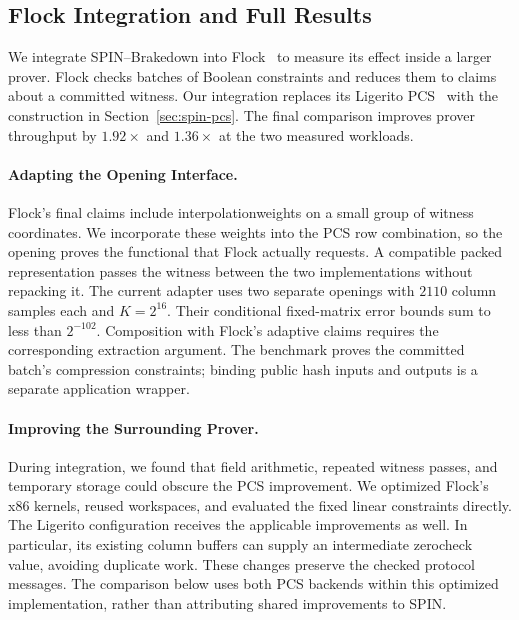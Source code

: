 \subsection{Flock Integration and Full Results}
\label{app:flock-details}

We integrate SPIN--Brakedown into Flock~\cite{flock26} to measure its
effect inside a larger prover. Flock checks batches of Boolean constraints
and reduces them to claims about a committed witness. Our integration
replaces its Ligerito PCS~\cite{ligerito25} with the construction in
Section~\ref{sec:spin-pcs}. The final comparison improves prover throughput
by $1.92\times$ and $1.36\times$ at the two measured workloads.

\paragraph{Adapting the Opening Interface.}
Flock's final claims include interpolation\linebreak weights on a small group of
witness coordinates. We incorporate these weights into the PCS row
combination, so the opening proves the functional that Flock actually
requests. A compatible packed representation passes the witness between
the two implementations without repacking it. The current adapter uses
two separate openings with $2110$ column samples each and $K=2^{16}$.
Their conditional fixed-matrix error bounds sum to less than $2^{-102}$.
Composition with Flock's adaptive claims requires the corresponding
extraction argument. The benchmark proves the committed batch's
compression constraints; binding public hash inputs and outputs is a
separate application wrapper.

\paragraph{Improving the Surrounding Prover.}
During integration, we found that field arithmetic, repeated witness
passes, and temporary storage could obscure the PCS improvement. We
optimized Flock's x86 kernels, reused workspaces, and evaluated the
fixed linear constraints directly. The Ligerito configuration receives
the applicable improvements as well. In particular, its existing
column buffers can supply an intermediate zerocheck value, avoiding
duplicate work. These changes preserve the checked protocol messages.
The comparison below uses both PCS backends within this optimized
implementation, rather than attributing shared improvements to SPIN.

